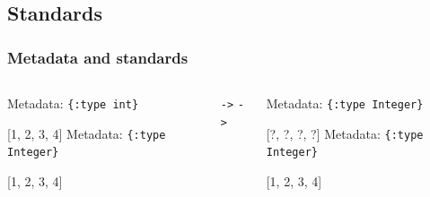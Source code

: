 \documentclass{beamer}
\newcommand{\linespace}{\vskip 0.25cm}
\begin{document}
\subsection{Standards}

\begin{frame}
  \frametitle{Metadata and standards}
  \begin{columns}
  \begin{column}{0.5\textwidth}
  Metadata: {\tt \{:type int\}}
  
  [1, 2, 3, 4]
  \linespace
  \linespace
  Metadata: {\tt \{:type Integer\}}
  
  [1, 2, 3, 4]
  \end{column}
  \begin{column}{0.05\textwidth} 
  {\tt->}
  \linespace
  \linespace
  {\tt->}
  \end{column}
  \begin{column}{0.5\textwidth}
  Metadata: {\tt \{:type Integer\}}
  
  [?, ?, ?, ?]
  \linespace
  \linespace
  Metadata: {\tt \{:type Integer\}}
  
  [1, 2, 3, 4]
  \end{column}
  \end{columns}
\end{frame}
\end{document}

